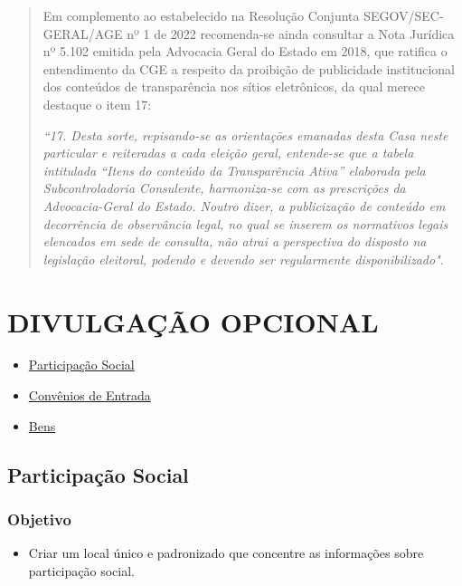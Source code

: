 \documentclass[
]{book}
\providecommand{\tightlist}{%
  \setlength{\itemsep}{0pt}\setlength{\parskip}{0pt}}
\begin{document}
\begin{quote}
Em complemento ao estabelecido na Resolução Conjunta SEGOV/SEC-GERAL/AGE nº 1 de 2022 recomenda-se ainda consultar a Nota Jurídica nº 5.102 emitida pela Advocacia Geral do Estado em 2018, que ratifica o entendimento da CGE a respeito da proibição de publicidade institucional dos conteúdos de transparência nos sítios eletrônicos, da qual merece destaque o item 17:

\emph{``17. Desta sorte, repisando-se as orientações emanadas desta Casa neste particular e reiteradas a cada eleição geral, entende-se que a tabela intitulada ``Itens do conteúdo da Transparência Ativa'' elaborada pela Subcontroladoria Consulente, harmoniza-se com as prescrições da Advocacia-Geral do Estado. Noutro dizer, a publicização de conteúdo em decorrência de observância legal, no qual se inserem os normativos legais elencados em sede de consulta, não atrai a perspectiva do disposto na legislação eleitoral, podendo e devendo ser regularmente disponibilizado"}.
\end{quote}

\hypertarget{divulgauxe7uxe3o-opcional}{%
\chapter{DIVULGAÇÃO OPCIONAL}\label{divulgauxe7uxe3o-opcional}}

\begin{itemize}
\tightlist
\item
  \href{participacao-social.html}{Participação Social}
\item
  \href{convenios-entrada.html}{Convênios de Entrada}
\item
  \href{bens.html}{Bens}
\end{itemize}

\hypertarget{participauxe7uxe3o-social}{%
\section{Participação Social}\label{participauxe7uxe3o-social}}

\hypertarget{objetivo-14}{%
\subsection{Objetivo}\label{objetivo-14}}

\begin{itemize}
\tightlist
\item
  Criar um local único e padronizado que concentre as informações sobre participação social.
\end{itemize}
\end{document}
